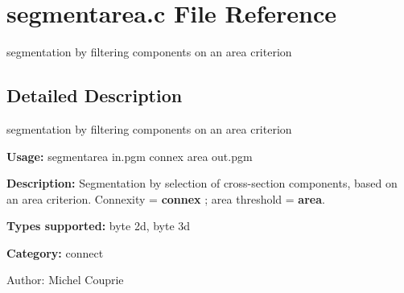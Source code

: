 \section{segmentarea.c File Reference}
\label{segmentarea_8c}
segmentation by filtering components on an area criterion 



\subsection{Detailed Description}
segmentation by filtering components on an area criterion 

{\bf Usage:} segmentarea in.pgm connex area out.pgm

{\bf Description:} Segmentation by selection of cross-section components, based on an area criterion. Connexity = {\bf connex} ; area threshold = {\bf area}.

{\bf Types supported:} byte 2d, byte 3d

{\bf Category:} connect

\begin{Desc}
\item[Author:]Michel Couprie \end{Desc}
